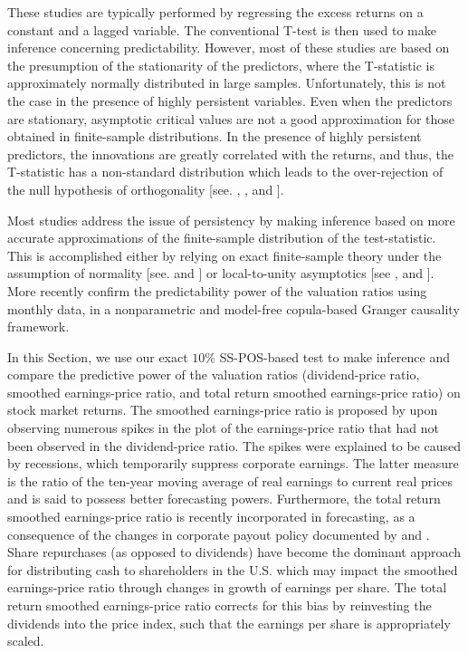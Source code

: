 \documentclass[harvard,11pt]{article}
\begin{document}
These studies are typically performed by regressing the excess returns on a constant and a lagged variable. The conventional T-test is then used to make inference concerning predictability. However, most of these studies are based on the presumption of the stationarity of the predictors, where the T-statistic is approximately normally distributed in large samples. Unfortunately, this is not the case in the presence of highly persistent variables. Even when the predictors are stationary, asymptotic critical values are not a good approximation for those obtained in finite-sample distributions. In the presence of highly persistent predictors, the innovations are greatly correlated with the returns, and thus, the T-statistic has a non-standard distribution which leads to the over-rejection of the null hypothesis of orthogonality [see. \citet{elliott1994inference}, \citet{mankiw1986we}, \citet{stambaugh1999predictive} and \citet{campbell2006efficient}].

 Most studies address the issue of persistency by making inference based on more accurate appro\-ximations of the finite-sample distribution of the test-statistic. This is accomplished either by relying on exact finite-sample theory under the assumption of normality [see. \citet{evans1981calculation,evans1984testing} and \citet{stambaugh1999predictive}] or local-to-unity asymptotics [see \citet{elliott1994inference}, \citet{campbell2006efficient} and \citet{torous2004predicting}]. More recently \citet{taamouti2014nonparametric} confirm the predictability power of the valuation ratios using monthly data, in a nonparametric and model-free copula-based Granger causality framework. 

In this Section, we use our exact $10\%$ SS-POS-based test to make inference and compare the
predictive power of the valuation ratios (dividend-price ratio, smoothed earnings-price ratio, and total return smoothed earnings-price ratio) on stock market returns. The smoothed earnings-price ratio is proposed by \citet{campbell1988dividend,campbell2001valuation} upon observing numerous spikes in the plot of the earnings-price ratio that had not been observed in the dividend-price ratio. The spikes were explained to be caused by recessions, which temporarily suppress corporate earnings. The latter measure is the ratio of the ten-year moving average of real earnings to current real prices and is said to possess better forecasting powers. Furthermore, the total return smoothed earnings-price ratio is recently incorporated in forecasting, as a consequence of the changes in corporate payout policy documented by \citet{bunn2014cape} and \citet{jivraj2017many}. Share repurchases (as opposed to dividends) have become the dominant approach for distributing cash to shareholders in the U.S. which may impact the smoothed earnings-price ratio through changes in growth of earnings per share. The total return smoothed earnings-price ratio corrects for this bias by reinvesting the dividends into the price index, such that the earnings per share is appropriately scaled. 
\end{document}
